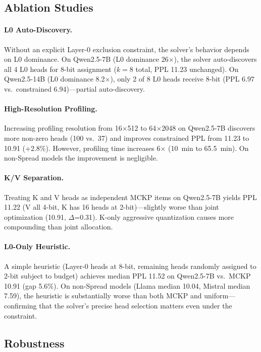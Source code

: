 \documentclass[11pt,a4paper]{article}
\begin{document}
\subsection{Ablation Studies}

\paragraph{L0 Auto-Discovery.}
Without an explicit Layer-0 exclusion constraint, the solver's behavior depends on L0 dominance. On Qwen2.5-7B (L0 dominance 26$\times$), the solver auto-discovers all 4 L0 heads for 8-bit assignment ($k{=}8$ total, PPL 11.23 unchanged). On Qwen2.5-14B (L0 dominance 8.2$\times$), only 2 of 8 L0 heads receive 8-bit (PPL 6.97 vs.\ constrained 6.94)---partial auto-discovery.

\paragraph{High-Resolution Profiling.}
Increasing profiling resolution from 16$\times$512 to 64$\times$2048 on Qwen2.5-7B discovers more non-zero heads (100 vs.\ 37) and improves constrained PPL from 11.23 to 10.91 (+2.8\%). However, profiling time increases 6$\times$ (10~min to 65.5~min). On non-Spread models the improvement is negligible.

\paragraph{K/V Separation.}
Treating K and V heads as independent MCKP items on Qwen2.5-7B yields PPL 11.22 (V all 4-bit, K has 16 heads at 2-bit)---slightly worse than joint optimization (10.91, $\Delta$=0.31). K-only aggressive quantization causes more compounding than joint allocation.

\paragraph{L0-Only Heuristic.}
A simple heuristic (Layer-0 heads at 8-bit, remaining heads randomly assigned to 2-bit subject to budget) achieves median PPL 11.52 on Qwen2.5-7B vs.\ MCKP 10.91 (gap 5.6\%). On non-Spread models (Llama median 10.04, Mistral median 7.59), the heuristic is substantially worse than both MCKP and uniform---confirming that the solver's precise head selection matters even under the constraint.

\subsection{Robustness}
\end{document}
